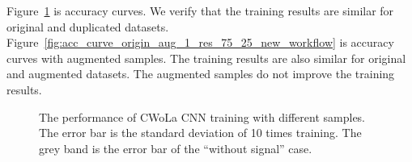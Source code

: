 \documentclass[12pt]{article}
\begin{document}
        Figure~\ref{fig:acc_curve_origin_copy_1_res_75_25_new_workflow} is accuracy curves. We verify that the training results are similar for original and duplicated datasets. Figure~\ref{fig:acc_curve_origin_aug_1_res_75_25_new_workflow} is accuracy curves with augmented samples. The training results are also similar for original and augmented datasets. The augmented samples do not improve the training results.
        \begin{figure}[htpb]
            \centering
            \caption{The performance of CWoLa CNN training with different samples. The error bar is the standard deviation of 10 times training. The grey band is the error bar of the ``without signal'' case.}
            \label{fig:acc_curve_origin_copy_1_res_75_25_new_workflow}
        \end{figure}
\end{document}
